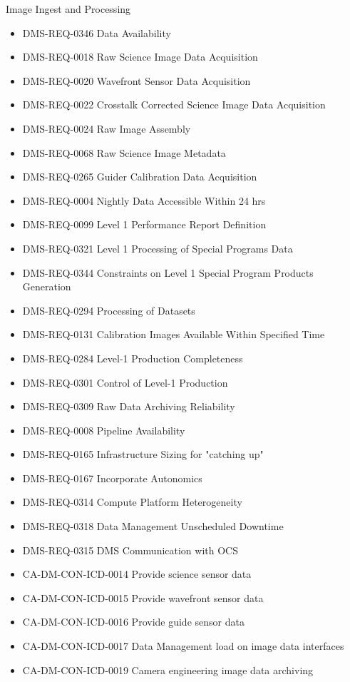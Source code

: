 Image Ingest and Processing \begin{itemize}
\item DMS-REQ-0346 Data Availability
\item DMS-REQ-0018 Raw Science Image Data Acquisition
\item DMS-REQ-0020 Wavefront Sensor Data Acquisition
\item DMS-REQ-0022 Crosstalk Corrected Science Image Data Acquisition
\item DMS-REQ-0024 Raw Image Assembly
\item DMS-REQ-0068 Raw Science Image Metadata
\item DMS-REQ-0265 Guider Calibration Data Acquisition
\item DMS-REQ-0004 Nightly Data Accessible Within 24 hrs
\item DMS-REQ-0099 Level 1 Performance Report Definition
\item DMS-REQ-0321 Level 1 Processing of Special Programs Data
\item DMS-REQ-0344 Constraints on Level 1 Special Program Products Generation
\item DMS-REQ-0294 Processing of Datasets
\item DMS-REQ-0131 Calibration Images Available Within Specified Time
\item DMS-REQ-0284 Level-1 Production Completeness
\item DMS-REQ-0301 Control of Level-1 Production
\item DMS-REQ-0309 Raw Data Archiving Reliability
\item DMS-REQ-0008 Pipeline Availability
\item DMS-REQ-0165 Infrastructure Sizing for "catching up"
\item DMS-REQ-0167 Incorporate Autonomics
\item DMS-REQ-0314 Compute Platform Heterogeneity
\item DMS-REQ-0318 Data Management Unscheduled Downtime
\item DMS-REQ-0315 DMS Communication with OCS
\item CA-DM-CON-ICD-0014 Provide science sensor data
\item CA-DM-CON-ICD-0015 Provide wavefront sensor data
\item CA-DM-CON-ICD-0016 Provide guide sensor data
\item CA-DM-CON-ICD-0017 Data Management load on image data interfaces
\item CA-DM-CON-ICD-0019 Camera engineering image data archiving

\end{itemize}
